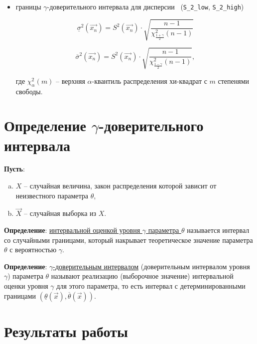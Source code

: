 \begin{itemize}[$\bullet$]
	\item границы $\gamma$-доверительного интервала для дисперсии ~(\texttt{S\_2\_low}, \texttt{S\_2\_high})
	
	\begin{equation}
		\underline{\sigma}^2(\overrightarrow{x_n}) = S^2(\overrightarrow{x_n}) \cdot \sqrt{\frac{n-1}{\chi^2_{\frac{1 + \gamma}{2}}(n-1)}}
	\end{equation}

	\begin{equation}
		\overline{\sigma}^2(\overrightarrow{x_n}) = S^2(\overrightarrow{x_n}) \cdot \sqrt{\frac{n-1}{\chi^2_{\frac{1 - \gamma}{2}}(n-1)}},
	\end{equation}

	где $\chi^2_{\alpha}(m)$ -- верхняя $\alpha$-квантиль распределения хи-квадрат с $m$ степенями свободы.

\end{itemize}

\clearpage

\section{Определение $\gamma$-доверительного интервала}

\textbf{Пусть}:

\begin{enumerate}[a)]
	\item $X$ -- случайная величина, закон распределения которой зависит от неизвестного параметра $\theta$,
	\item $\overrightarrow{X}$ -- случайная выборка из $X$.
\end{enumerate}

\textbf{Определение}: \underline{интервальной оценкой уровня $\gamma$ параметра $\theta$} называется интервал со случайными границами, который накрывает теоретическое значение параметра $\theta$ с вероятностью $\gamma$.

\textbf{Определение}: \underline{$\gamma$-доверительным интервалом} (доверительным интервалом уровня $\gamma$) параметра $\theta$ называют реализацию (выборочное значение) интервальной оценки уровня $\gamma$ для этого параметра, то есть интервал с детерминированными границами $(\underline{\theta}(\overrightarrow{x}), \overline{\theta}(\overrightarrow{x}))$.

\clearpage

\section{Результаты работы}

